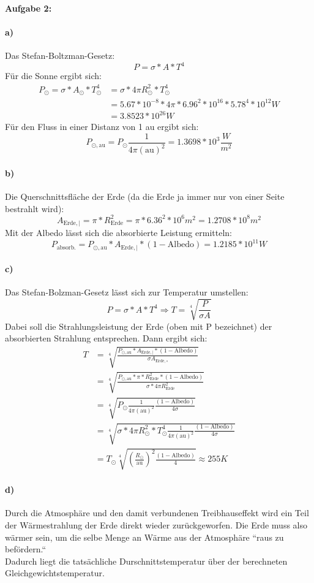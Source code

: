 \documentclass[a4paper 11pt]{article}
\begin{document}
\textbf{\large Aufgabe 2:} 
\paragraph{a)} 
Das Stefan-Boltzman-Gesetz:
\[
	P = \sigma * A * T^4
\]
Für die Sonne ergibt sich:
\begin{align*}
	P_\odot = \sigma * A_\odot * T_\odot^4
	&= \sigma * 4\pi R_\odot^2 * T_\odot^4 \\
	&= 5.67  * 10^{-8} * 4\pi * 6.96^2 * 10^{16} * 5.78^4 * 10^{12} W
	\\
	&= 3.8523 * 10^{26} W
\end{align*}
Für den Fluss in einer Distanz von 1 au ergibt sich:
\[
	P_{\odot, \text{au}}
	= P_\odot \frac{1}{4\pi(\text{au})^2}
	= 1.3698 * 10 ^3 \frac{W}{m^2}
	\]

\paragraph{b)}
Die Querschnittsfläche der Erde (da die Erde ja immer nur von einer Seite 
bestrahlt wird):
\[
	A_{\text{Erde}, \vert} = \pi * R_{\text{Erde}}^2 
	= \pi * 6.36^2 * 10^6 m^2
	= 1.2708 * 10^8 m^2
\]
Mit der Albedo lässt sich die absorbierte Leistung ermitteln:
\[
	P_{\text{absorb.}} =
	P_{\odot, \text{au}} * A_{\text{Erde}, \vert} * (1 - \text{Albedo})
	=
	1.2185 * 10^{11} W
\]
\paragraph{c)}
Das Stefan-Bolzman-Gesetz lässt sich zur Temperatur umstellen:
\[
	P = \sigma * A * T^4 \Rightarrow
	T = \sqrt[4]{\frac P {\sigma A}}
\]
Dabei soll die Strahlungsleistung der Erde (oben mit P bezeichnet) der absorbierten Strahlung entsprechen. Dann ergibt sich:
\begin{align*}
	T 
	&= \sqrt[4]{\frac{ P_{\odot, \text{au}} * A_{\text{Erde}, \vert} * 
	(1 - \text{Albedo})}{\sigma A_{\text{Erde}, \circ}}} \\
	&= \sqrt[4]{\frac{ P_{\odot, \text{au}} * \pi * R_{\text{Erde}}^2 * (1-\text{Albedo}) }
	{\sigma * 4\pi R_{\text{Erde}}^2 }} \\
	&= \sqrt[4]{
		P_\odot \frac{1}{4\pi(\text{au})^2}
		\frac{(1-\text{Albedo})}{4 \sigma}} \\
	&= \sqrt[4]{
		\sigma * 4\pi R_\odot^2 * T_\odot^4 
		\frac{1}{4\pi(\text{au})^2}
		\frac{(1-\text{Albedo})}{4 \sigma}} \\
	&= T_\odot \sqrt[4]{
		\left( \frac{R_\odot}{\text{au}} \right)^2
		\frac{(1-\text{Albedo})}{4}}
	\approx 255 K
\end{align*}

\paragraph{d)}
Durch die Atmosphäre und den damit verbundenen Treibhauseffekt wird ein 
Teil der Wärmestrahlung der Erde direkt wieder zurückgeworfen. Die Erde
muss also wärmer sein, um die selbe Menge an Wärme aus der Atmosphäre ``raus
zu befördern.``\\
Dadurch liegt die tatsächliche Durschnittstemperatur über der berechneten 
Gleichgewichtstemperatur.
\end{document}
